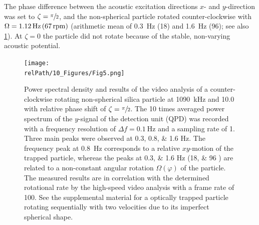 The phase difference between the acoustic excitation directions $x$- and 
$y$-direction was set to $\zeta=\sfrac{\pi}{2}$, and the non-spherical particle 
rotated counter-clockwise with $\Omega = \SI{1.12}{\hertz}\,(\SI{67}{rpm})$ 
(arithmetic mean of \SI{0.3}{\hertz} (\SI{18}{\rpm}) and \SI{1.6}{\hertz} 
(\SI{96}{\rpm}); see also \cref{fig:VT-Fig5}). At $\zeta=0$ the particle did not 
rotate because of the stable, non-varying acoustic potential.

\begin{figure}
    \centering
    \texttt{[image: \\relPath/10\_Figures/Fig5.png]}
    \caption{Power spectral density and results of the video analysis of a 
      counter-clockwise rotating non-spherical silica particle at 
      \SI{1090}{\kilo\hertz} and \SI{10.0}{\Vrms} with relative phase shift of 
      $\zeta= \sfrac{\pi}{2}$. The 10 times averaged power spectrum of the 
      $y$-signal of the detection unit (QPD) was recorded with a frequency 
      resolution of $\Delta f = \SI{0.1}{\hertz}$ and a sampling rate of 
      \SI{1}{\MS}. Three main peaks were observed at \numlist{0.3; 0.8; 1.6} 
      \si{\hertz}. The frequency peak at \SI{0.8}{\hertz} corresponds to a 
      relative $xy$-motion of the trapped particle, whereas the peaks at 
      \numlist{0.3; 1.6} \si{\hertz} (\numlist{18;96} \si{\rpm}) are related to 
      a non-constant angular rotation $\Omega(\varphi)$ of the particle. The 
      measured results are in correlation with the determined rotational rate by 
      the high-speed video analysis with a frame rate of \SI{100}{\fps}. See the 
      supplemental material for a optically trapped particle rotating 
      sequentially with two velocities due to its imperfect spherical 
  shape.\label{fig:VT-Fig5}}
\end{figure}%

